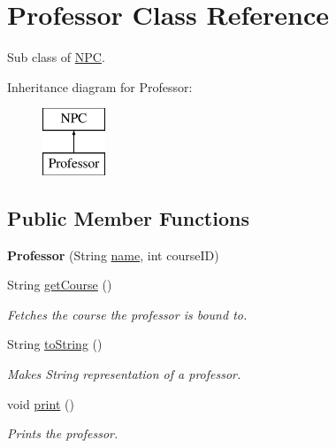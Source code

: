 \hypertarget{classProfessor}{}\section{Professor Class Reference}
\label{classProfessor}


Sub class of \hyperlink{classNPC}{N\+P\+C}.  


Inheritance diagram for Professor\+:\begin{figure}[H]
\begin{center}
\leavevmode
\includegraphics[height=2.000000cm]{classProfessor}
\end{center}
\end{figure}
\subsection*{Public Member Functions}
\begin{DoxyCompactItemize}
\item 
\hypertarget{classProfessor_ad5d9f88c7887d9cc34678643c9e2aa9b}{}{\bfseries Professor} (String \hyperlink{classNPC_aea85d6c8ba3ff811f54571fde45f5329}{name}, int course\+I\+D)\label{classProfessor_ad5d9f88c7887d9cc34678643c9e2aa9b}

\item 
\hypertarget{classProfessor_a116ed1d5348bb5071f75d031ded48147}{}String \hyperlink{classProfessor_a116ed1d5348bb5071f75d031ded48147}{get\+Course} ()\label{classProfessor_a116ed1d5348bb5071f75d031ded48147}

\begin{DoxyCompactList}\small\item\em Fetches the course the professor is bound to. \end{DoxyCompactList}\item 
\hypertarget{classProfessor_ad341254c6e6a4f8f86e54b65d148008b}{}String \hyperlink{classProfessor_ad341254c6e6a4f8f86e54b65d148008b}{to\+String} ()\label{classProfessor_ad341254c6e6a4f8f86e54b65d148008b}

\begin{DoxyCompactList}\small\item\em Makes String representation of a professor. \end{DoxyCompactList}\item 
\hypertarget{classProfessor_ab9d19baf3798b2e827c3f7db3b08845e}{}void \hyperlink{classProfessor_ab9d19baf3798b2e827c3f7db3b08845e}{print} ()\label{classProfessor_ab9d19baf3798b2e827c3f7db3b08845e}

\begin{DoxyCompactList}\small\item\em Prints the professor. \end{DoxyCompactList}\end{DoxyCompactItemize}
